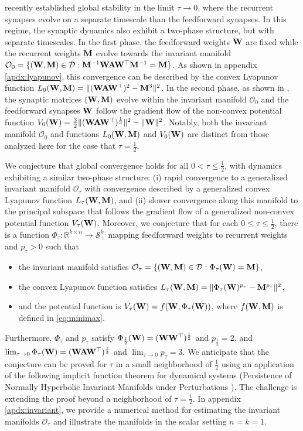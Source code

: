 \documentclass[11pt]{article}
\theoremstyle{definition}
\newcommand{\A}{{\bf A}}
\newcommand{\M}{{\bf M}}
\newcommand{\R}{\mathbb{R}}
\newcommand{\W}{{\bf W}}
\newcommand{\calD}{\mathcal{D}}
\newcommand{\calO}{\mathcal{O}}
\newcommand{\calS}{\mathcal{S}}
\begin{document}
\citet{centorrino2025similarity} recently established global stability in the limit $\tau\to0$, where the recurrent synapses evolve on a separate timescale than the feedforward synapses.
In this regime, the synaptic dynamics also exhibit a two-phase structure, but with separate timescales.
In the first phase, the feedforward weights $\W$ are fixed while the recurrent weights $\M$ evolve towards the invariant manifold $\calO_0=\{(\W,\M)\in\calD:\M^{-1}\W\A\W^\top\M^{-1}=\M\}$.
As shown in appendix \ref{apdx:lyapunov}, this convergence can be described by the convex Lyapunov function $L_0(\W,\M)=\|(\W\A\W^\top)^2-\M^3\|^2$.
In the second phase, as shown in \citep[section 5.3]{centorrino2025similarity}, the synaptic matrices $(\W,\M)$ evolve within the invariant manifold $\calO_0$ and the feedforward synapses $\W$ follow the gradient flow of the non-convex potential function $V_0(\W)=\frac32\|(\W\A\W^\top)^{\frac13}\|^2-\|\W\|^2$. 
Notably, both the invariant manifold $\calO_0$ and functions $L_0(\W,\M)$ and $V_0(\W)$ are distinct from those analyzed here for the case that $\tau=\frac12$.

We conjecture that global convergence holds for all $0<\tau\le\frac12$, with dynamics exhibiting a similar two-phase structure: (i) rapid convergence to a generalized invariant manifold $\calO_\tau$ with convergence described by a generalized convex Lyapunov function $L_\tau(\W,\M)$, and (ii) slower convergence along this manifold to the principal subspace that follows the gradient flow of a generalized non-convex potential function $V_\tau(\W)$.
Moreover, we conjecture that for each $0\le\tau\le\frac12$, there is a function $\Phi_\tau:\R^{k\times n}\to\calS_{+}^k$ mapping feedforward weights to recurrent weights and $p_\tau>0$ such that 
\begin{itemize}
    \item the invariant manifold satisfies $\calO_\tau=\{(\W,\M)\in\calD:\Phi_\tau(\W)=\M\}$,
    \item the convex Lyapunov function satisfies $L_\tau(\W,\M)=\|\Phi_\tau(\W)^{p_\tau}-\M^{p_\tau}\|^2$,
    \item and the potential function is $V_\tau(\W)=f(\W,\Phi_\tau(\W))$, where $f(\W,\M)$ is defined in \eqref{eq:minimax}.
\end{itemize}
Furthermore, $\Phi_\tau$ and $p_\tau$ satisfy $\Phi_{\frac12}(\W)=(\W\W^\top)^{\frac12}$ and $p_{\frac12}=2$, and $\lim_{\tau\to0}\Phi_\tau(\W)=(\W\A\W^\top)^{\frac13}$ and $\lim_{\tau\to0}p_\tau=3$.
We anticipate that the conjecture can be proved for $\tau$ in a small neighborhood of $\frac12$ using an application of the following implicit function theorem for dynamical systems (Persistence of Normally Hyperbolic Invariant Manifolds under Perturbations \citep{HirschPughShub1977}). The challenge is extending the proof beyond a neighborhood of $\tau=\frac12$.
In appendix \ref{apdx:invariant}, we provide a numerical method for estimating the invariant manifolds $\calO_\tau$ and illustrate the manifolds in the scalar setting $n=k=1$.
\end{document}
